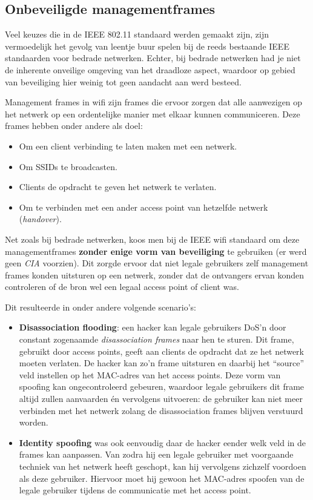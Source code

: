 \documentclass[
  10pt,
  dutch,
  paper=a4,
  ,captions=tableheading
]{scrbook}
\providecommand{\tightlist}{%
  \setlength{\itemsep}{0pt}\setlength{\parskip}{0pt}}
\begin{document}
\subsection{Onbeveiligde
managementframes}\label{onbeveiligde-managementframes}

Veel keuzes die in de IEEE 802.11 standaard werden gemaakt zijn, zijn
vermoedelijk het gevolg van leentje buur spelen bij de reeds bestaande
IEEE standaarden voor bedrade netwerken. Echter, bij bedrade netwerken
had je niet de inherente onveilige omgeving van het draadloze aspect,
waardoor op gebied van beveiliging hier weinig tot geen aandacht aan
werd besteed.

Management frames in wifi zijn frames die ervoor zorgen dat alle
aanwezigen op het netwerk op een ordentelijke manier met elkaar kunnen
communiceren. Deze frames hebben onder andere als doel:

\begin{itemize}
\tightlist
\item
  Om een client verbinding te laten maken met een netwerk.
\item
  Om SSIDs te broadcasten.
\item
  Clients de opdracht te geven het netwerk te verlaten.
\item
  Om te verbinden met een ander access point van hetzelfde netwerk
  (\emph{handover}).
\end{itemize}

Net zoals bij bedrade netwerken, koos men bij de IEEE wifi standaard om
deze managementframes \textbf{zonder enige vorm van beveiliging} te
gebruiken (er werd geen \emph{CIA} voorzien). Dit zorgde ervoor dat niet
legale gebruikers zelf management frames konden uitsturen op een
netwerk, zonder dat de ontvangers ervan konden controleren of de bron
wel een legaal access point of client was.

Dit resulteerde in onder andere volgende scenario's:

\begin{itemize}
\tightlist
\item
  \textbf{Disassociation flooding}: een hacker kan legale gebruikers
  DoS'n door constant zogenaamde \emph{disassociation frames} naar hen
  te sturen. Dit frame, gebruikt door access points, geeft aan clients
  de opdracht dat ze het netwerk moeten verlaten. De hacker kan zo'n
  frame uitsturen en daarbij het ``source'' veld instellen op het
  MAC-adres van het access points. Deze vorm van spoofing kan
  ongecontroleerd gebeuren, waardoor legale gebruikers dit frame altijd
  zullen aanvaarden én vervolgens uitvoeren: de gebruiker kan niet meer
  verbinden met het netwerk zolang de disassociation frames blijven
  verstuurd worden.
\item
  \textbf{Identity spoofing} was ook eenvoudig daar de hacker eender
  welk veld in de frames kan aanpassen. Van zodra hij een legale
  gebruiker met voorgaande techniek van het netwerk heeft geschopt, kan
  hij vervolgens zichzelf voordoen als deze gebruiker. Hiervoor moet hij
  gewoon het MAC-adres spoofen van de legale gebruiker tijdens de
  communicatie met het access point.
\end{itemize}
\end{document}
